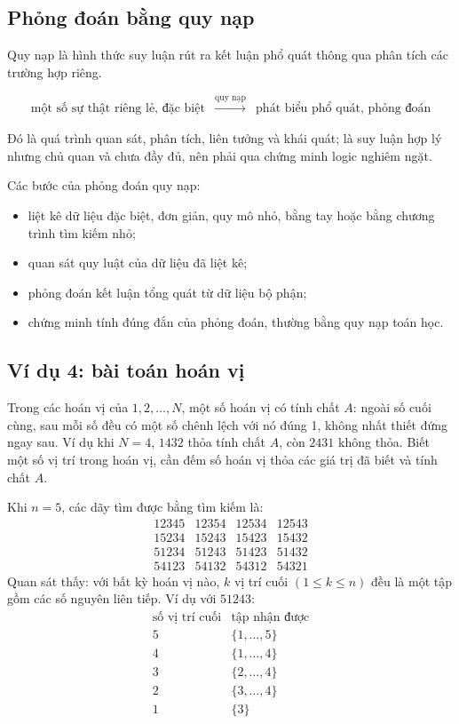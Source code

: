 \documentclass[11pt]{article}
\begin{document}
\subsection{Phỏng đoán bằng quy nạp}

Quy nạp là hình thức suy luận rút ra kết luận phổ quát thông qua phân tích
các trường hợp riêng.

\[
\begin{array}{ccc}
\text{một số sự thật riêng lẻ, đặc biệt}
&\xrightarrow{\text{quy nạp}}&
\text{phát biểu phổ quát, phỏng đoán}
\end{array}
\]

Đó là quá trình quan sát, phân tích, liên tưởng và khái quát; là suy luận hợp
lý nhưng chủ quan và chưa đầy đủ, nên phải qua chứng minh logic nghiêm ngặt.

Các bước của phỏng đoán quy nạp:
\begin{itemize}
  \item liệt kê dữ liệu đặc biệt, đơn giản, quy mô nhỏ, bằng tay hoặc bằng
  chương trình tìm kiếm nhỏ;
  \item quan sát quy luật của dữ liệu đã liệt kê;
  \item phỏng đoán kết luận tổng quát từ dữ liệu bộ phận;
  \item chứng minh tính đúng đắn của phỏng đoán, thường bằng quy nạp toán học.
\end{itemize}

\subsection{Ví dụ 4: bài toán hoán vị}

Trong các hoán vị của \(1,2,\ldots,N\), một số hoán vị có tính chất \(A\):
ngoài số cuối cùng, sau mỗi số đều có một số chênh lệch với nó đúng 1, không
nhất thiết đứng ngay sau. Ví dụ khi \(N=4\), \(1432\) thỏa tính chất \(A\),
còn \(2431\) không thỏa. Biết một số vị trí trong hoán vị, cần đếm số hoán vị
thỏa các giá trị đã biết và tính chất \(A\).

Khi \(n=5\), các dãy tìm được bằng tìm kiếm là:
\[
\begin{array}{llll}
12345 & 12354 & 12534 & 12543\\
15234 & 15243 & 15423 & 15432\\
51234 & 51243 & 51423 & 51432\\
54123 & 54132 & 54312 & 54321
\end{array}
\]
Quan sát thấy: với bất kỳ hoán vị nào, \(k\) vị trí cuối
\((1\le k\le n)\) đều là một tập gồm các số nguyên liên tiếp. Ví dụ với
\(51243\):
\[
\begin{array}{c|c}
\text{số vị trí cuối} & \text{tập nhận được}\\ \hline
5 & \{1,\ldots,5\}\\
4 & \{1,\ldots,4\}\\
3 & \{2,\ldots,4\}\\
2 & \{3,\ldots,4\}\\
1 & \{3\}
\end{array}
\]
\end{document}
